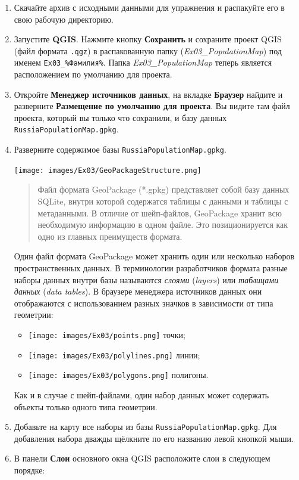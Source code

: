 \documentclass[
  12pt,
]{book}
\providecommand{\tightlist}{%
  \setlength{\itemsep}{0pt}\setlength{\parskip}{0pt}}
\begin{document}
\begin{enumerate}
\def\labelenumi{\arabic{enumi}.}
\item
  Скачайте архив с исходными данными для упражнения и распакуйте его в свою рабочую директорию.
\item
  Запустите \textbf{QGIS}. Нажмите кнопку \textbf{Сохранить} и сохраните проект QGIS (файл формата \texttt{.qgz}) в распакованную папку (\emph{Ex03\_PopulationMap}) под именем \texttt{Ex03\_\%Фамилия\%}. Папка \emph{Ex03\_PopulationMap} теперь является расположением по умолчанию для проекта.
\item
  Откройте \textbf{Менеджер источников данных}, на вкладке \textbf{Браузер} найдите и разверните \textbf{Размещение по умолчанию для проекта}. Вы видите там файл проекта, который вы только что сохранили, и базу данных \texttt{RussiaPopulationMap.gpkg}.
\item
  Разверните содержимое базы \texttt{RussiaPopulationMap.gpkg}.

  \texttt{[image: images/Ex03/GeoPackageStructure.png]}

  \begin{quote}
  Файл формата GeoPackage (*.gpkg) представляет собой базу данных SQLite, внутри которой содержатся таблицы с данными и таблицы с метаданными. В отличие от шейп-файлов, GeoPackage хранит всю необходимую информацию в одном файле. Это позиционируется как одно из главных преимуществ формата.
  \end{quote}

  Один файл формата GeoPackage может хранить один или несколько наборов пространственных данных. В терминологии разработчиков формата разные наборы данных внутри базы называются \emph{слоями} (\emph{layers}) или \emph{таблицами данных} (\emph{data tables}). В браузере менеджера источников данных они отображаются с использованием разных значков в зависимости от типа геометрии:

  \begin{itemize}
  \tightlist
  \item
    \texttt{[image: images/Ex03/points.png]} точки;
  \item
    \texttt{[image: images/Ex03/polylines.png]} линии;
  \item
    \texttt{[image: images/Ex03/polygons.png]} полигоны.
  \end{itemize}

  Как и в случае с шейп-файлами, один набор данных может содержать объекты только одного типа геометрии.
\item
  Добавьте на карту все наборы из базы \texttt{RussiaPopulationMap.gpkg}. Для добавления набора дважды щёлкните по его названию левой кнопкой мыши.
\item
  В панели \textbf{Слои} основного окна QGIS расположите слои в следующем порядке:


\end{enumerate}
\end{document}
